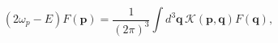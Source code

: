 \begin{equation}
(2\omega _{p}-E)F(\mathbf{p})=\frac{1}{(2\pi )^{3}}\int d^{3}\mathbf{q}%
\,\mathcal{K}(\mathbf{p},\mathbf{q})F(\mathbf{q}),
\end{equation}

